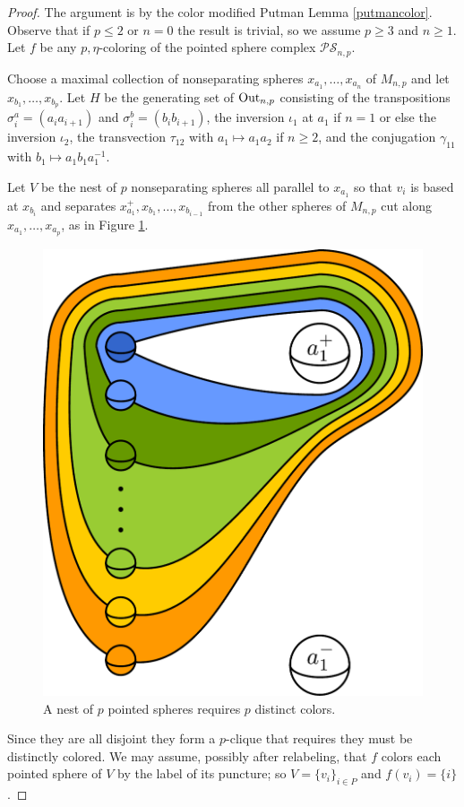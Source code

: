 \begin{proof}
  The argument is by the color modified Putman Lemma \ref{putmancolor}.
  Observe that if $p \leq 2$ or $n=0$ the result is trivial, so we assume $p \geq 3$ and $n \geq 1$.
  Let $f$ be any $p,\eta$-coloring of the pointed sphere complex $\mathcal{PS}_{n,p}$.

  Choose a maximal collection of nonseparating spheres $x_{a_1},\ldots,x_{a_n}$ of $M_{n,p}$
  and let $x_{b_1}, \ldots, x_{b_p}$.
  Let $H$ be the generating set of $\operatorname{Out}_{n,p}$ consisting of the transpositions
    $\sigma^a_{i} = (a_i a_{i+1})$
    and $\sigma^b_{i} = (b_i b_{i+1})$,
    the inversion $\iota_1$ at $a_1$ if $n=1$ or else the inversion $\iota_2$,
    the transvection $\tau_{12}$ with $a_1 \mapsto a_1a_2$ if $n\geq 2$,
    and the conjugation $\gamma_{11}$ with $b_1 \mapsto a_1b_1a_1^{-1}$.



  Let $V$ be the nest of $p$  nonseparating spheres all parallel to $x_{a_1}$
  so that $v_i$ is based at $x_{b_i}$  and separates $x^+_{a_1}, x_{b_1}, \ldots, x_{b_{i-1}}$ from
  the other spheres of $M_{n,p}$ cut along $x_{a_1},\ldots, x_{a_p}$, as in Figure \ref{fig:ptspherenest}.

  \begin{figure}[h!]
    \centering
    \includegraphics[width=.3\textwidth]{figures/ptspherenest.pdf}
    \caption{A nest of $p$ pointed spheres requires $p$ distinct colors.}
    \label{fig:ptspherenest}
  \end{figure}


  Since they are all disjoint they form a $p$-clique that requires they must be distinctly colored.
  We may assume, possibly after relabeling, that $f$ colors each
  pointed sphere of $V$ by the label of its puncture; so $V = \{v_i\}_{i\in P}$ and $f(v_i)=\{i\}$.


\end{proof}
